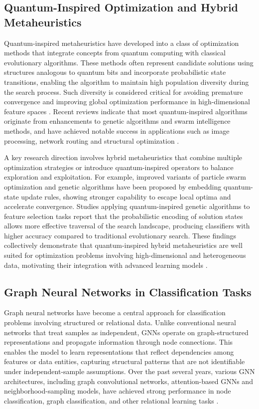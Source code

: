 \documentclass[11pt,a4paper]{article}
\begin{document}
\subsection{Quantum-Inspired Optimization and Hybrid Metaheuristics}
Quantum-inspired metaheuristics have developed into a class of optimization methods that integrate concepts from quantum computing with classical evolutionary algorithms. These methods often represent candidate solutions using structures analogous to quantum bits and incorporate probabilistic state transitions, enabling the algorithm to maintain high population diversity during the search process. Such diversity is considered critical for avoiding premature convergence and improving global optimization performance in high-dimensional feature spaces \citep{ref5}. Recent reviews indicate that most quantum-inspired algorithms originate from enhancements to genetic algorithms and swarm intelligence methods, and have achieved notable success in applications such as image processing, network routing and structural optimization \citep{ref6}.

A key research direction involves hybrid metaheuristics that combine multiple optimization strategies or introduce quantum-inspired operators to balance exploration and exploitation. For example, improved variants of particle swarm optimization and genetic algorithms have been proposed by embedding quantum-state update rules, showing stronger capability to escape local optima and accelerate convergence. Studies applying quantum-inspired genetic algorithms to feature selection tasks report that the probabilistic encoding of solution states allows more effective traversal of the search landscape, producing classifiers with higher accuracy compared to traditional evolutionary search. These findings collectively demonstrate that quantum-inspired hybrid metaheuristics are well suited for optimization problems involving high-dimensional and heterogeneous data, motivating their integration with advanced learning models \citep{ref7,ref8,ref9,ref10}.

\subsection{Graph Neural Networks in Classification Tasks}
Graph neural networks have become a central approach for classification problems involving structured or relational data. Unlike conventional neural networks that treat samples as independent, GNNs operate on graph-structured representations and propagate information through node connections. This enables the model to learn representations that reflect dependencies among features or data entities, capturing structural patterns that are not identifiable under independent-sample assumptions. Over the past several years, various GNN architectures, including graph convolutional networks, attention-based GNNs and neighborhood-sampling models, have achieved strong performance in node classification, graph classification, and other relational learning tasks \citep{ref11}.
\end{document}

